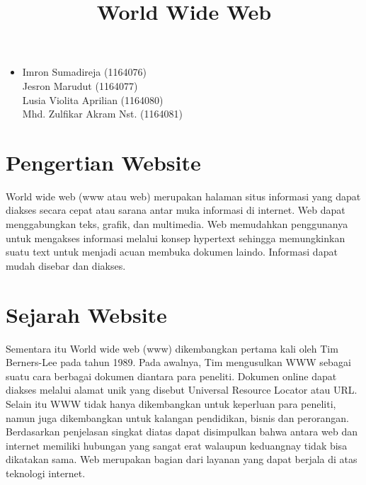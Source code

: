 \documentclass[12pt, a4paper]{article}
\begin{document}
\title{World Wide Web}
\maketitle

\begin{itemize}
\item
	Imron Sumadireja (1164076) \\
	Jesron Marudut (1164077) \\
	Lusia Violita Aprilian (1164080) \\
	Mhd. Zulfikar Akram Nst. (1164081) \\
\end{itemize}

\section{Pengertian Website}
World wide web (www atau web) merupakan halaman situs informasi yang dapat diakses secara cepat atau sarana
antar muka informasi di internet. Web dapat menggabungkan teks, grafik, dan multimedia. Web memudahkan
penggunanya untuk mengakses informasi melalui konsep hypertext sehingga memungkinkan  suatu text untuk
menjadi acuan membuka dokumen laindo. Informasi dapat mudah disebar dan diakses.

\section{Sejarah Website}
Sementara itu World wide web (www) dikembangkan pertama kali oleh Tim Berners-Lee pada tahun 1989. Pada
awalnya, Tim mengusulkan WWW sebagai suatu cara berbagai dokumen diantara para peneliti. Dokumen online dapat
diakses melalui alamat unik yang disebut Universal Resource Locator atau URL. Selain itu WWW tidak hanya
dikembangkan untuk keperluan para peneliti, namun juga dikembangkan untuk kalangan pendidikan, bisnis dan
perorangan. Berdasarkan penjelasan singkat diatas dapat disimpulkan bahwa antara web dan internet memiliki
hubungan yang sangat erat walaupun keduangnay tidak bisa dikatakan sama. Web merupakan bagian dari layanan
yang dapat berjala di atas teknologi internet.
\end{document}
